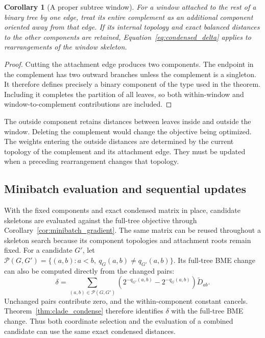 \documentclass[11pt,a4paper]{article}
\makeatletter
\DeclareRobustCommand{\_}{\ifmmode\nfss@text{\textunderscore}\else\textunderscore\allowbreak\fi}
\newtheorem{corollary}[theorem]{Corollary}
\theoremstyle{definition}
\makeatother
\begin{document}
\begin{corollary}[A proper subtree window]
\label{cor:outside}
For a window attached to the rest of a binary tree by one edge, treat its entire complement as an additional component oriented away from that edge.
If its internal topology and exact balanced distances to the other components are retained, Equation~\eqref{eq:condensed_delta} applies to rearrangements of the window skeleton.
\end{corollary}
\begin{proof}
Cutting the attachment edge produces two components.
The endpoint in the complement has two outward branches unless the complement is a singleton.
It therefore defines precisely a binary component of the type used in the theorem.
Including it completes the partition of all leaves, so both within-window and window-to-complement contributions are included.
\end{proof}

The outside component retains distances between leaves inside and outside the window.
Deleting the complement would change the objective being optimized.
The weights entering the outside distances are determined by the current topology of the complement and its attachment edge.
They must be updated when a preceding rearrangement changes that topology.

\subsection{Minibatch evaluation and sequential updates}
\label{sec:acceptance}

With the fixed components and exact condensed matrix in place, candidate skeletons are evaluated against the full-tree objective through Corollary~\ref{cor:minibatch_gradient}.
The same matrix can be reused throughout a skeleton search because its component topologies and attachment roots remain fixed.
For a candidate $G'$, let $\mathcal P(G,G')=\{(a,b):a<b,\ q_G(a,b)\ne q_{G'}(a,b)\}$.
Its full-tree BME change can also be computed directly from the changed pairs:
\begin{equation}
 \delta=\sum_{(a,b)\in\mathcal P(G,G')}
   \left(2^{-q_{G'}(a,b)}-2^{-q_G(a,b)}\right)
   \widetilde D_{ab}.
 \label{eq:changed_pairs}
\end{equation}
Unchanged pairs contribute zero, and the within-component constant cancels.
Theorem~\ref{thm:clade_condense} therefore identifies $\delta$ with the full-tree BME change.
Thus both coordinate selection and the evaluation of a combined candidate can use the same exact condensed distances.
\end{document}
